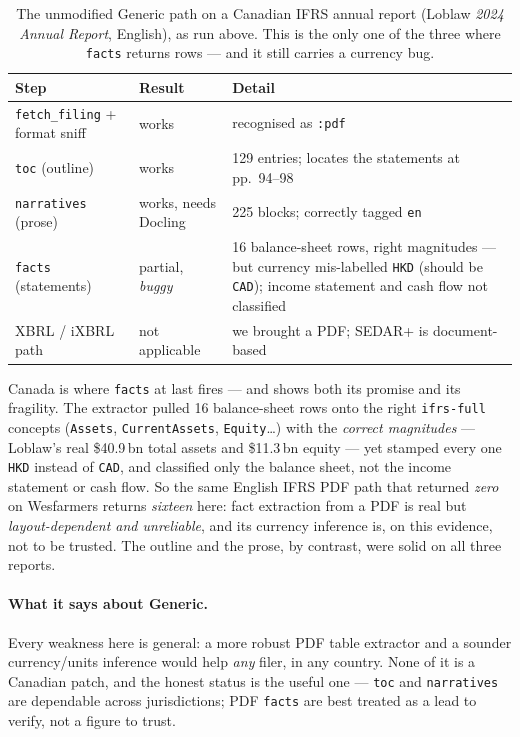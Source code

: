\documentclass[11pt,a4paper]{report}
\begin{document}
\begin{table}[h]
\centering
\small
\caption{The unmodified Generic path on a Canadian IFRS annual report (Loblaw \emph{2024 Annual Report},
English), as run above. This is the only one of the three where \texttt{facts} returns rows --- and it still
carries a currency bug.}
\label{tab:generic-canada}
\begin{tabular}{@{}p{}p{}p{}@{}}
\toprule
\textbf{Step} & \textbf{Result} & \textbf{Detail} \\
\midrule
\texttt{fetch\_filing} + format sniff & works & recognised as \texttt{:pdf} \\
\texttt{toc} (outline) & works & 129 entries; locates the statements at pp.~94--98 \\
\texttt{narratives} (prose) & works, needs Docling & 225 blocks; correctly tagged \texttt{en} \\
\texttt{facts} (statements) & partial, \emph{buggy} & 16 balance-sheet rows, right magnitudes --- but currency mis-labelled \texttt{HKD} (should be \texttt{CAD}); income statement and cash flow not classified \\
XBRL / iXBRL path & not applicable & we brought a PDF; SEDAR+ is document-based \\
\bottomrule
\end{tabular}
\end{table}

\noindent Canada is where \texttt{facts} at last fires --- and shows both its promise and its fragility. The
extractor pulled 16 balance-sheet rows onto the right \texttt{ifrs-full} concepts (\texttt{Assets},
\texttt{CurrentAssets}, \texttt{Equity}\ldots) with the \emph{correct magnitudes} --- Loblaw's real
\$40.9\,bn total assets and \$11.3\,bn equity --- yet stamped every one \texttt{HKD} instead of \texttt{CAD},
and classified only the balance sheet, not the income statement or cash flow. So the same English IFRS PDF path
that returned \emph{zero} on Wesfarmers returns \emph{sixteen} here: fact extraction from a PDF is real but
\emph{layout-dependent and unreliable}, and its currency inference is, on this evidence, not to be trusted. The
outline and the prose, by contrast, were solid on all three reports.

\paragraph{What it says about Generic.} Every weakness here is general: a more robust PDF table extractor and a
sounder currency/units inference would help \emph{any} filer, in any country. None of it is a Canadian patch,
and the honest status is the useful one --- \texttt{toc} and \texttt{narratives} are dependable across
jurisdictions; PDF \texttt{facts} are best treated as a lead to verify, not a figure to trust.
\end{document}
